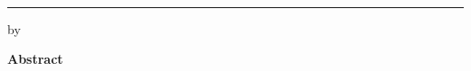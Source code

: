 
\thispagestyle{plain} \cleardoublepage

\topmargin -0.5in

\begin{center}
\huge \TITLE{} \\
\normalsize
\rule{5.5in}{1.5pt}
\vskip 0.5cm
by~\AUTHOR

\vskip 0.5cm {\bf Abstract}
\end{center}


\begin{small}
\


\end{small}                                       %

